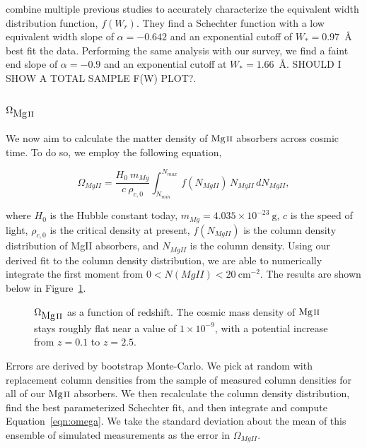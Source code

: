 \documentclass[iop,apj,numberedappendix,appendixfloats,twocolappendix]{emulateapj}
\begin{document}
\cite{Kacprzak2011MgII} combine multiple previous studies to accurately characterize the equivalent width distribution function, $f(W_r)$. They find a Schechter function with a low equivalent width slope of $\alpha = -0.642$ and an exponential cutoff of $W_* = 0.97$~{\AA} best fit the data. Performing the same analysis with our survey, we find a faint end slope of $\alpha = -0.9$ and an exponential cutoff at $W_* = 1.66$~{\AA}. SHOULD I SHOW A TOTAL SAMPLE F(W) PLOT?.


\subsection{$\Omega_{\hbox{{\rm Mg}\kern 0.1em{\sc ii}}}$}
\label{omegamgii}

We now aim to calculate the matter density of ${\hbox{{\rm Mg}\kern 0.1em{\sc ii}}}$ absorbers across cosmic time. To do so, we employ the following equation,

\begin{equation}
\Omega_{MgII} = \frac{H_0\  m_{Mg}}{c\ \rho_{c,0}} \int_{N_{min}}^{N_{max}}\, f (N_{MgII})\, N_{MgII}\, dN_{MgII} ,
\label{eqn:omega}
\end{equation}

where $H_0$ is the Hubble constant today, $m_{Mg} = 4.035 \times 10^{-23}~\mathrm{g}$, $c$ is the speed of light, $\rho_{c,0}$ is the critical density at present, $f(N_{MgII})$ is the column density distribution of {MgII} absorbers, and $N_{MgII}$ is the column density. Using our derived fit to the column density distribution, we are able to numerically integrate the first moment from $0 < N(MgII) < 20~\mathrm{cm^{-2}}$. The results are shown below in Figure~\ref{fig:omegamgii}. 

\begin{figure*}[bth]
\caption{$\Omega_{\hbox{{\rm Mg}\kern 0.1em{\sc ii}}}$ as a function of redshift. The cosmic mass density of ${\hbox{{\rm Mg}\kern 0.1em{\sc ii}}}$ stays roughly flat near a value of $1 \times 10^{-9}$, with a potential increase from $z = 0.1$ to $z = 2.5$.}
\label{fig:omegamgii}
\end{figure*}

Errors are derived by bootstrap Monte-Carlo. We pick at random with replacement column densities from the sample of measured column densities for all of our ${\hbox{{\rm Mg}\kern 0.1em{\sc ii}}}$ absorbers. We then recalculate the column density distribution, find the best parameterized Schechter fit, and then integrate and compute Equation~\ref{eqn:omega}. We take the standard deviation about the mean of this ensemble of simulated measurements as the error in $\Omega_{MgII}$. 
\end{document}
